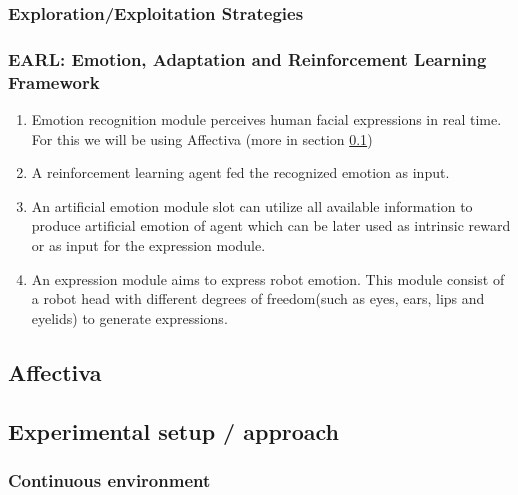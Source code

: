 \documentclass[conference]{IEEEtran}
\begin{document}
\subsubsection{Exploration/Exploitation Strategies}

\subsubsection{EARL: Emotion, Adaptation and Reinforcement Learning Framework}

\begin{enumerate}
    \item Emotion recognition module perceives human facial expressions in real time. For this we will be using Affectiva \cite{affectiva} (more in section \ref{sec:affectiva})
    \item A reinforcement learning agent fed the recognized emotion as input.
    \item An artificial emotion module slot can utilize all available information to produce artificial emotion of agent which can be later used as intrinsic reward or as input for the expression module.
    \item An expression module aims to express robot emotion. This module consist of a robot head with different degrees of freedom(such as eyes, ears, lips and eyelids) to generate expressions.
\end{enumerate}

\subsection{Affectiva} \label{sec:affectiva}
    
\subsection{Experimental setup / approach}

\subsubsection{Continuous environment}
\end{document}
